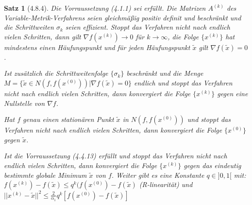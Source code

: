 \documentclass[ngerman,halfparskip]{scrartcl}
\newtheorem*{satz}{Satz}
\theoremstyle{definition}
\begin{document}
\begin{satz}[4.8.4]
Die Vorraussetzung (4.1.1) sei erfüllt. Die Matrizen $A^{(k)}$ des Variable-Metrik-Verfahrens seien gleichmäßig positiv definit und beschränkt und die Schrittweiten $\sigma_k$ seien effizient. Stoppt das Verfahren nicht nach endlich vielen Schritten, dann gilt $\nabla f(x^{(k)})\to 0$ für $k\to\infty$, die Folge $\{x^{(k)}\}$ hat mindestens einen Häufungspunkt und für jeden Häufungspunkt $\tilde x$ gilt $\nabla f(\tilde x)=0$.

Ist zusätzlich die Schrittweitenfolge $\{\sigma_k\}$ beschränkt und die Menge $M=\{\tilde x \in N(f,f(x^{(0)})) | \nabla f(\tilde x)=0\}$ endlich und stoppt das Verfahren nicht nach endlich vielen Schritten, dann konvergiert die Folge $\{x^{(k)}\}$ gegen eine Nullstelle von $\nabla f$.

Hat $f$ genau einen stationären Punkt $\tilde x$ in $N(f,f(x^{(0)}))$ und stoppt das Verfahren nicht nach endlich vielen Schritten, dann konvergiert die Folge $\{x^{(0)}\}$ gegen $\tilde x$.

Ist die Vorraussetzung (4.4.13) erfüllt und stoppt das Verfahren nicht nach endlich vielen Schritten, dann konvergiert die Folge $\{x^{(k)}\}$ gegen das eindeutig bestimmte globale Minimum $\tilde x$ von $f$. Weiter gibt es eine Konstante $q\in]0,1[$ mit: $f(x^{(k)})-f(\tilde x)\leq q^k(f(x^{(0)})-f(\tilde x)$ (R-linearität) und $||x^{(k)}-\tilde x||^2 \leq \frac 2{\alpha_1}q^k\left[ f(x^{(0)})-f(\tilde x) \right]$
\end{satz}
\end{document}
